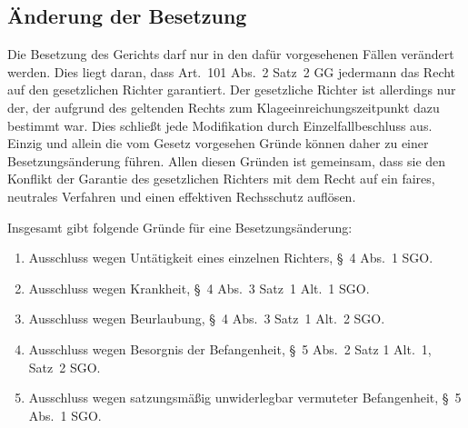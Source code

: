 \subsection{Änderung der Besetzung}
\label{Zusammensetzung:Spruchkoerper:Aenderung}
Die Besetzung des Gerichts darf nur in den dafür vorgesehenen Fällen verändert werden.
Dies liegt daran, dass Art.~101 Abs.~2 Satz~2 GG jedermann das Recht auf den gesetzlichen Richter garantiert.
Der gesetzliche Richter ist allerdings nur der, der aufgrund des geltenden Rechts zum Klageeinreichungszeitpunkt dazu bestimmt war.
Dies schließt jede Modifikation durch Einzelfallbeschluss aus.
Einzig und allein die vom Gesetz vorgesehen Gründe können daher zu einer Besetzungsänderung führen.
Allen diesen Gründen ist gemeinsam, dass sie den Konflikt der Garantie des gesetzlichen Richters mit dem Recht auf ein faires, neutrales Verfahren und einen effektiven Rechsschutz auflösen.

Insgesamt gibt folgende Gründe für eine Besetzungsänderung:
\begin{enumerate}
\item Ausschluss wegen Untätigkeit eines einzelnen Richters, \S~4 Abs.~1 SGO.
\item Ausschluss wegen Krankheit, \S~4 Abs.~3 Satz~1 Alt.~1 SGO.
\item Ausschluss wegen Beurlaubung, \S~4 Abs.~3 Satz~1 Alt.~2 SGO.
\item Ausschluss wegen Besorgnis der Befangenheit, \S~5 Abs.~2 Satz 1 Alt.~1, Satz~2 SGO.
\item Ausschluss wegen satzungsmäßig unwiderlegbar vermuteter Befangenheit, \S~5 Abs.~1 SGO.
\end{enumerate}

